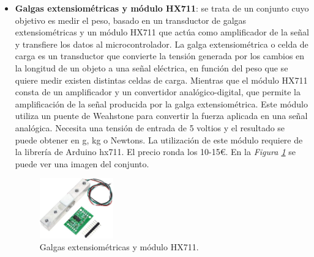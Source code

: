 \begin{itemize}
    \item \textbf{Galgas extensiométricas y módulo HX711}\cite{GyHX711_1,GyHX711_2}: se trata de un conjunto cuyo objetivo es medir el peso, basado en un transductor de galgas extensiométricas y un módulo HX711 que actúa como amplificador de la señal y transfiere los datos al microcontrolador. La galga extensiométrica o celda de carga es un transductor que convierte la tensión generada por los cambios en la longitud de un objeto a una señal eléctrica, en función del peso que se quiere medir existen distintas celdas de carga. Mientras que el módulo HX711 consta de un amplificador y un convertidor analógico-digital, que permite la amplificación de la señal producida por la galga extensiométrica. Este módulo utiliza un puente de Weahstone para convertir la fuerza aplicada en una señal analógica. Necesita una tensión de entrada de 5 voltios y el resultado se puede obtener en g, kg o Newtons. La utilización de este módulo requiere de la librería de Arduino hx711. El precio ronda los 10-15€. En la \textit{Figura \ref{fig:HX711}} se puede ver una imagen del conjunto.
\begin{figure}[h!]
    \centering
    \includegraphics[width=0.3\textwidth]{img/GyHX711.jpg}
    \caption{Galgas extensiométricas y módulo HX711\cite{imgGyHX711}.}
    \label{fig:HX711} 
\end{figure}


\end{itemize}
